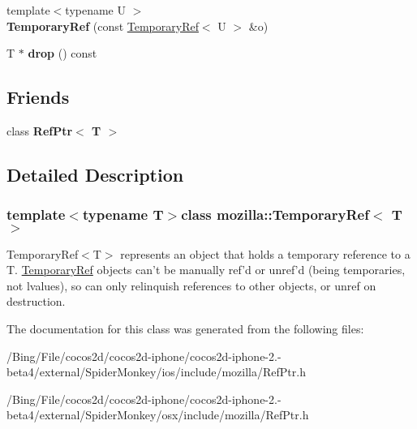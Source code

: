 \begin{DoxyCompactItemize}
\item 
\hypertarget{classmozilla_1_1_temporary_ref_aa18f235c1cbb895e5b5fddf18a83e68d}{{\footnotesize template$<$typename U $>$ }\\{\bfseries Temporary\-Ref} (const \hyperlink{classmozilla_1_1_temporary_ref}{Temporary\-Ref}$<$ U $>$ \&o)}\label{classmozilla_1_1_temporary_ref_aa18f235c1cbb895e5b5fddf18a83e68d}

\item 
\hypertarget{classmozilla_1_1_temporary_ref_a2dd073d4eb62ad4cd25574033492b1be}{T $\ast$ {\bfseries drop} () const }\label{classmozilla_1_1_temporary_ref_a2dd073d4eb62ad4cd25574033492b1be}

\end{DoxyCompactItemize}
\subsection*{Friends}
\begin{DoxyCompactItemize}
\item 
\hypertarget{classmozilla_1_1_temporary_ref_a8e460ca80d19e4ea35d5957bf064c592}{class {\bfseries Ref\-Ptr$<$ T $>$}}\label{classmozilla_1_1_temporary_ref_a8e460ca80d19e4ea35d5957bf064c592}

\end{DoxyCompactItemize}


\subsection{Detailed Description}
\subsubsection*{template$<$typename T$>$class mozilla\-::\-Temporary\-Ref$<$ T $>$}

Temporary\-Ref$<$\-T$>$ represents an object that holds a temporary reference to a T. \hyperlink{classmozilla_1_1_temporary_ref}{Temporary\-Ref} objects can't be manually ref'd or unref'd (being temporaries, not lvalues), so can only relinquish references to other objects, or unref on destruction. 

The documentation for this class was generated from the following files\-:\begin{DoxyCompactItemize}
\item 
/\-Bing/\-File/cocos2d/cocos2d-\/iphone/cocos2d-\/iphone-\/2.-\/beta4/external/\-Spider\-Monkey/ios/include/mozilla/Ref\-Ptr.\-h\item 
/\-Bing/\-File/cocos2d/cocos2d-\/iphone/cocos2d-\/iphone-\/2.-\/beta4/external/\-Spider\-Monkey/osx/include/mozilla/Ref\-Ptr.\-h\end{DoxyCompactItemize}
